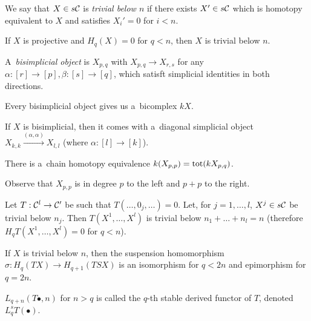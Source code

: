     \begin{definition}
        We say that $X \in s\mathcal{C}$ is {\em trivial below $n$}
        if there exists $X' \in s\mathcal{C}$ which is homotopy equivalent to $X$
        and satisfies $X_i' = 0$ for $i<n$.
    \end{definition}
    
    \begin{lemma}
        If $X$ is projective and $H_q(X) = 0$
        for $q<n$, then $X$ is trivial below $n$.
    \end{lemma}
    
    \begin{remark}[digression]
        A~{\em bisimplicial object}
        is $X_{p,q}$ with $X_{p,q} \to X_{r,s}$
        for any $\alpha:[r]\to [p], \beta:[s]\to [q]$,
        which satisft simplicial identities in both directions.
        
        Every bisimplicial object gives us a~bicomplex $kX$.
        
        If $X$ is bisimplicial, then it comes with a~diagonal
        simplicial object $X_{k,k} \xrightarrow{(\alpha,\alpha)} X_{l,l}$
        (where $\alpha:[l]\to[k]$).
    \end{remark}
    
    \begin{theorem}
        There is a~chain homotopy equivalence 
        $k(X_{p,p}) = {\mathrm{tot}}(k X_{p,q})$.
    \end{theorem}
    
    \begin{remark}
        Observe that $X_{p,p}$ is in degree $p$
        to the left and $p+p$ to the right.
    \end{remark}
    
    \begin{proposition}
        Let $T:\mathcal{C}^l \to \mathcal{C}'$
        be such that $T(\ldots, 0_j, \ldots) = 0$.
        Let, for $j=1, \ldots, l$, $X^j \in s\mathcal{C}$ be trivial below $n_j$.
        Then $T(X^1, \ldots, X^l)$ is trivial below $n_1 + \ldots + n_l = n$
        (therefore $H_q T(X^1, \ldots, X^l) = 0$ for $q < n$).
    \end{proposition}
    
    \begin{corollary}
        If $X$ is trivial below $n$, then the suspension homomorphism
        $\sigma:H_q(TX) \to H_{q+1}(TSX)$ is an isomorphism
        for $q<2n$ and epimorphism for $q = 2n$.
    \end{corollary}
    
    \begin{definition}
        $L_{q+n}(T \bullet, n)$ for $n>q$ is called
        the $q$-th stable derived functor of $T$,
        denoted $L_q^s T(\bullet)$.
    \end{definition}


 
 